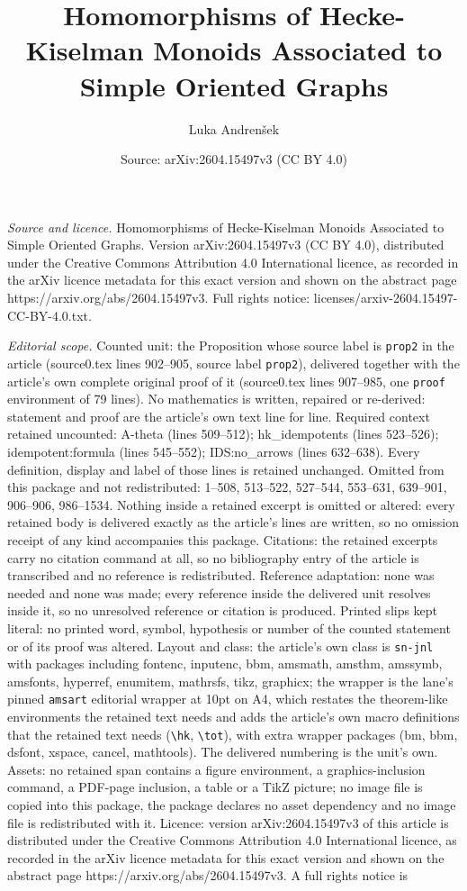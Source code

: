 \documentclass[10pt,a4paper]{amsart}
\title[Homomorphisms of Hecke-Kiselman Monoids Associated to Simple]{Homomorphisms of Hecke-Kiselman Monoids Associated to Simple Oriented Graphs}
\author{Luka Andren\v{s}ek}
\date{Source: arXiv:2604.15497v3 (CC BY 4.0)}
\begin{document}
\maketitle

\noindent\emph{Source and licence.} Homomorphisms of Hecke-Kiselman Monoids Associated to Simple Oriented Graphs. Version arXiv:2604.15497v3 (CC BY 4.0), distributed under the Creative Commons Attribution 4.0 International licence, as recorded in the arXiv licence metadata for this exact version and shown on the abstract page https://arxiv.org/abs/2604.15497v3. Full rights notice: licenses/arxiv-2604.15497-CC-BY-4.0.txt.\par\smallskip

\noindent\textit{Editorial scope.} Counted unit: the Proposition whose source label is \texttt{prop2} in the article (source0.tex lines 902--905, source label \texttt{prop2}), delivered together with the article's own complete original proof of it (source0.tex lines 907--985, one \texttt{proof} environment of 79 lines). No mathematics is written, repaired or re-derived: statement and proof are the article's own text line for line. Required context retained uncounted: A-theta (lines 509--512); hk\_idempotents (lines 523--526); idempotent:formula (lines 545--552); IDS:no\_arrows (lines 632--638). Every definition, display and label of those lines is retained unchanged. Omitted from this package and not redistributed: 1--508, 513--522, 527--544, 553--631, 639--901, 906--906, 986--1534. Nothing inside a retained excerpt is omitted or altered: every retained body is delivered exactly as the article's lines are written, so no omission receipt of any kind accompanies this package. Citations: the retained excerpts carry no citation command at all, so no bibliography entry of the article is transcribed and no reference is redistributed. Reference adaptation: none was needed and none was made; every reference inside the delivered unit resolves inside it, so no unresolved reference or citation is produced. Printed slips kept literal: no printed word, symbol, hypothesis or number of the counted statement or of its proof was altered. Layout and class: the article's own class is \texttt{sn-jnl} with packages including fontenc, inputenc, bbm, amsmath, amsthm, amssymb, amsfonts, hyperref, enumitem, mathrsfs, tikz, graphicx; the wrapper is the lane's pinned \texttt{amsart} editorial wrapper at 10pt on A4, which restates the theorem-like environments the retained text needs and adds the article's own macro definitions that the retained text needs (\texttt{\textbackslash hk}, \texttt{\textbackslash tot}), with extra wrapper packages (bm, bbm, dsfont, xspace, cancel, mathtools). The delivered numbering is the unit's own. Assets: no retained span contains a figure environment, a graphics-inclusion command, a PDF-page inclusion, a table or a TikZ picture; no image file is copied into this package, the package declares no asset dependency and no image file is redistributed with it. Licence: version arXiv:2604.15497v3 of this article is distributed under the Creative Commons Attribution 4.0 International licence, as recorded in the arXiv licence metadata for this exact version and shown on the abstract page https://arxiv.org/abs/2604.15497v3. A full rights notice is 
\end{document}
